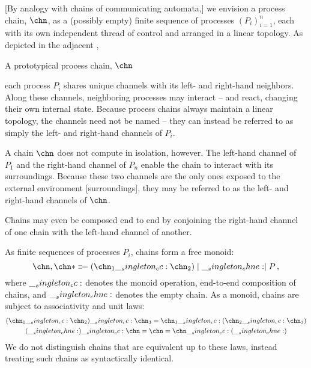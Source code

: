 [By analogy with chains of communicating automata,] we envision a process chain, $\chn$, as a (possibly empty) finite sequence of processes $(P_i)_{i=1}^{n}$, each with its own independent thread of control and arranged in a linear topology.
As depicted in the adjacent ,%
%
\begin{marginfigure}
  \centering
  \caption{A prototypical process chain, $\chn$}\label{fig:singleton-processes:chain-topology}
\end{marginfigure}
%
each process $P_i$ shares unique channels with its left- and right-hand neighbors.
Along these channels, neighboring processes may interact -- and react, changing their own internal state.
Because process chains always maintain a linear topology, the channels need not be named -- they can instead be referred to as simply the left- and right-hand channels of $P_i$.

A chain $\chn$ does not compute in isolation, however.
The left-hand channel of $P_1$ and the right-hand channel of $P_n$ enable the chain to interact with its surroundings.
Because these two channels are the only ones exposed to the external environment [surroundings], they may be referred to as the left- and right-hand channels of $\chn$.

Chains may even be composed end to end by conjoining the right-hand channel of one chain with the left-hand channel of another.

As finite sequences of processes $P_i$, chains form a free monoid:
\begin{equation*}
  \chn,\chn* \Coloneqq (\chn_1 \cc \chn_2) \mid \chne \mid P
  \,,
\end{equation*}
where $\__singleton_cc:$ denotes the monoid operation, end-to-end composition of chains, and $\__singleton_chne:$ denotes the empty chain.
As a monoid, chains are subject to associativity and unit laws:
\begin{gather*}
  (\chn_1 \cc \chn_2) \cc \chn_3 = \chn_1 \cc (\chn_2 \cc \chn_3) \\
  (\chne) \cc \chn = \chn = \chn \cc (\chne)
\end{gather*}
We do not distinguish chains that are equivalent up to these laws, instead treating such chains as syntactically identical.


